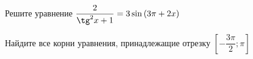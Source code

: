 \begin{ex}
	\begin{condition}
		\begin{enumcols}[label=\asbuk*)]
			\item Решите уравнение \( \dfrac{2}{\tg^2 x + 1} = 3\sin{(3\pi + 2x)} \)
			\item Найдите все корни уравнения, принадлежащие отрезку \( \left[-\dfrac{3\pi}{2};\pi\right] \)
		\end{enumcols}
	\end{condition}
\end{ex}